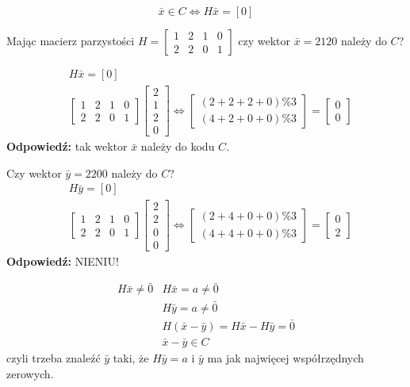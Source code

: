 \begin{fact}
$$\bar{x}\in C\Leftrightarrow H\bar{x}=[0]$$
\end{fact}
\begin{example*}
Mając macierz parzystości $H=\begin{bmatrix}
1&2&1&0\\2&2&0&1
\end{bmatrix}$ czy wektor $\bar{x}=2120$ należy do $C$?

\begin{align*}
&H\bar{x}=[0]\\
&\begin{bmatrix}
1&2&1&0\\2&2&0&1
\end{bmatrix}\begin{bmatrix}
2\\1\\2\\0
\end{bmatrix}\Leftrightarrow \begin{bmatrix}
(2+2+2+0)\%3\\
(4+2+0+0)\%3
\end{bmatrix}=\begin{bmatrix}
0\\0
\end{bmatrix}
\end{align*}
\textbf{Odpowiedź: }tak wektor $\bar{x}$ należy do kodu $C$.

Czy wektor $\bar{y}=2200$ należy do $C$?
\begin{align*}
&H\bar{y}=[0]\\
&\begin{bmatrix}
1&2&1&0\\2&2&0&1
\end{bmatrix}\begin{bmatrix}
2\\2\\0\\0
\end{bmatrix}\Leftrightarrow \begin{bmatrix}
(2+4+0+0)\%3\\
(4+4+0+0)\%3
\end{bmatrix}=\begin{bmatrix}
0\\2
\end{bmatrix}
\end{align*}
\textbf{Odpowiedź: }NIENIU!
\end{example*}
\begin{problem}
\begin{align*}
H\bar{x}\neq \bar{0}& H\bar{x}=a\neq \bar{0}\\
&H\bar{y} =a\neq\bar{0}\\
&H(\bar{x}-\bar{y})=H\bar{x}-H\bar{y}=\bar{0}\\
&\bar{x}-\bar{y}\in C
\end{align*}
czyli trzeba znaleźć $\bar{y}$ taki, że $H\bar{y}=a$ i $\bar{y}$ ma jak najwięcej współrzędnych zerowych.
\end{problem}

